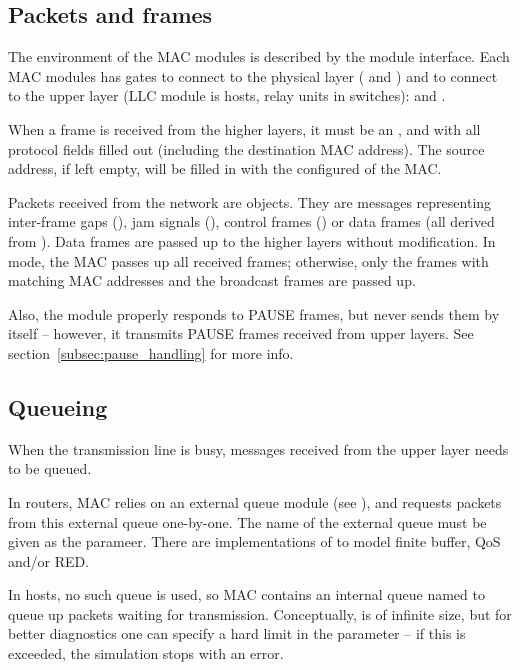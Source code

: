 \subsection*{Packets and frames}

The environment of the MAC modules is described by the 
module interface. Each MAC modules has gates to connect to the physical
layer ( and ) and to connect to the upper layer
(LLC module is hosts, relay units in switches):  and
.

When a frame is received from the higher layers, it must be an
, and with all protocol fields filled out
(including the destination MAC address). The source address, if left empty,
will be filled in with the configured  of the MAC.


Packets received from the network are  objects.
They are messages representing inter-frame gaps (),
jam signals (), control frames ()
or data frames (all derived from ). Data frames
are passed up to the higher layers without modification.
In  mode, the MAC passes up all received frames;
otherwise, only the frames with matching MAC addresses and
the broadcast frames are passed up.

Also, the module properly responds to PAUSE frames, but never sends them
by itself -- however, it transmits PAUSE frames received from upper layers.
See section~\ref{subsec:pause_handling} for more info.

\subsection*{Queueing}

When the transmission line is busy, messages received from the upper layer
needs to be queued.

In routers, MAC relies on an external queue module (see ),
and requests packets from this external queue one-by-one. The name of the
external queue must be given as the  parameer.
There are implementations of  to model finite buffer,
QoS and/or RED.

In hosts, no such queue is used, so MAC contains an internal
queue named  to queue up packets waiting for transmission.
Conceptually,  is of infinite size, but for better diagnostics
one can specify a hard limit in the  parameter -- if this is
exceeded, the simulation stops with an error.

